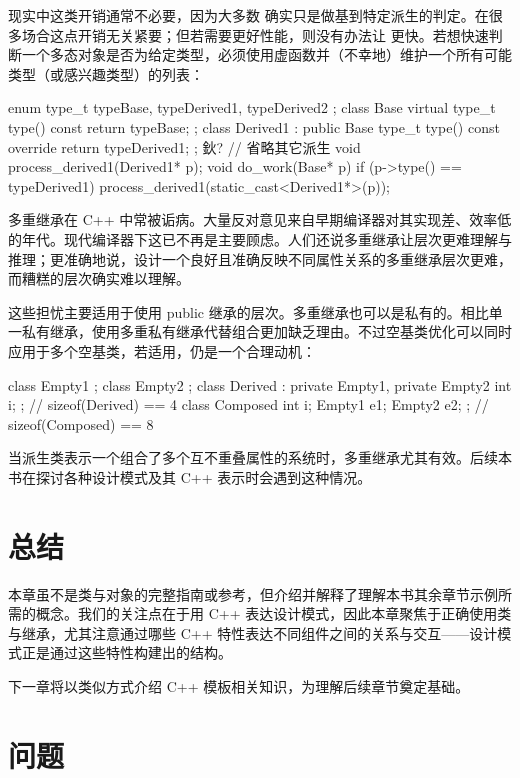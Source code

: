 现实中这类开销通常不必要，因为大多数 确实只是做基到特定派生的判定。在很多场合这点开销无关紧要；但若需要更好性能，则没有办法让 更快。若想快速判断一个多态对象是否为给定类型，必须使用虚函数并（不幸地）维护一个所有可能类型（或感兴趣类型）的列表：

\begin{code}
enum type_t { typeBase, typeDerived1, typeDerived2 };
class Base {
  virtual type_t type() const { return typeBase; }
};
class Derived1 : public Base {
  type_t type() const override { return typeDerived1; }
};
鈥? // 省略其它派生
void process_derived1(Derived1* p);
void do_work(Base* p) {
  if (p->type() == typeDerived1) {
    process_derived1(static_cast<Derived1*>(p));
  }
}
\end{code}

多重继承在 C++ 中常被诟病。大量反对意见来自早期编译器对其实现差、效率低的年代。现代编译器下这已不再是主要顾虑。人们还说多重继承让层次更难理解与推理；更准确地说，设计一个良好且准确反映不同属性关系的多重继承层次更难，而糟糕的层次确实难以理解。

这些担忧主要适用于使用 public 继承的层次。多重继承也可以是私有的。相比单一私有继承，使用多重私有继承代替组合更加缺乏理由。不过空基类优化可以同时应用于多个空基类，若适用，仍是一个合理动机：

\begin{code}
class Empty1 {};
class Empty2 {};
class Derived : private Empty1, private Empty2 {
  int i;
};   // sizeof(Derived) == 4
class Composed {
  int i;
  Empty1 e1;
  Empty2 e2;
};   // sizeof(Composed) == 8
\end{code}

当派生类表示一个组合了多个互不重叠属性的系统时，多重继承尤其有效。后续本书在探讨各种设计模式及其 C++ 表示时会遇到这种情况。

\section{总结}

本章虽不是类与对象的完整指南或参考，但介绍并解释了理解本书其余章节示例所需的概念。我们的关注点在于用 C++ 表达设计模式，因此本章聚焦于正确使用类与继承，尤其注意通过哪些 C++ 特性表达不同组件之间的关系与交互——设计模式正是通过这些特性构建出的结构。

下一章将以类似方式介绍 C++ 模板相关知识，为理解后续章节奠定基础。

\section{问题}

